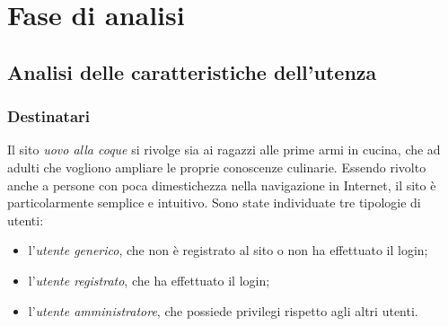 \section{Fase di analisi}
\subsection{Analisi delle caratteristiche dell'utenza}
\label{sub:analisi_delle_caratteristiche_dell_utenza}
\subsubsection{Destinatari}
\label{subs:destinatari}
Il sito \emph{uovo alla coque} si rivolge sia ai ragazzi alle prime armi in cucina, che ad adulti che vogliono ampliare le proprie conoscenze culinarie. Essendo rivolto anche a persone con poca dimestichezza nella navigazione in Internet, il sito è particolarmente semplice e intuitivo. Sono state individuate tre tipologie di utenti:
\begin{itemize}
    \item l'\textit{utente generico}, che non è registrato al sito o non ha effettuato il login;
    \item l'\textit{utente registrato}, che ha effettuato il login;
    \item l'\textit{utente amministratore}, che possiede privilegi rispetto agli altri utenti.
\end{itemize}

